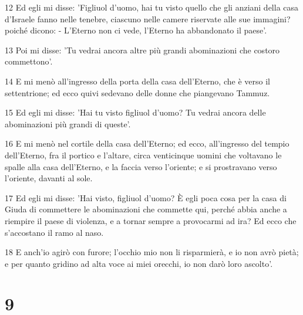 \par 12 Ed egli mi disse: 'Figliuol d'uomo, hai tu visto quello che gli anziani della casa d'Israele fanno nelle tenebre, ciascuno nelle camere riservate alle sue immagini? poiché dicono: - L'Eterno non ci vede, l'Eterno ha abbandonato il paese'.
\par 13 Poi mi disse: 'Tu vedrai ancora altre più grandi abominazioni che costoro commettono'.
\par 14 E mi menò all'ingresso della porta della casa dell'Eterno, che è verso il settentrione; ed ecco quivi sedevano delle donne che piangevano Tammuz.
\par 15 Ed egli mi disse: 'Hai tu visto figliuol d'uomo? Tu vedrai ancora delle abominazioni più grandi di queste'.
\par 16 E mi menò nel cortile della casa dell'Eterno; ed ecco, all'ingresso del tempio dell'Eterno, fra il portico e l'altare, circa venticinque uomini che voltavano le spalle alla casa dell'Eterno, e la faccia verso l'oriente; e si prostravano verso l'oriente, davanti al sole.
\par 17 Ed egli mi disse: 'Hai visto, figliuol d'uomo? È egli poca cosa per la casa di Giuda di commettere le abominazioni che commette qui, perché abbia anche a riempire il paese di violenza, e a tornar sempre a provocarmi ad ira? Ed ecco che s'accostano il ramo al naso.
\par 18 E anch'io agirò con furore; l'occhio mio non li risparmierà, e io non avrò pietà; e per quanto gridino ad alta voce ai miei orecchi, io non darò loro ascolto'.

\chapter{9}


